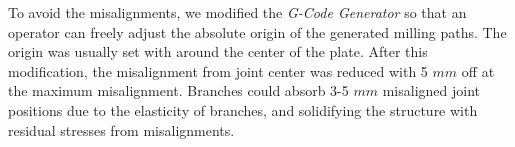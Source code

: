 To avoid the misalignments, we modified the \textit{G-Code Generator} so that an operator can freely adjust the absolute origin of the generated milling paths.
The origin was usually set with around the center of the plate.
After this modification, the misalignment from joint center was reduced with 5 $mm$ off at the maximum misalignment.
Branches could absorb 3-5 $mm$ misaligned joint positions due to the elasticity of branches, and solidifying the structure with residual stresses from misalignments.




